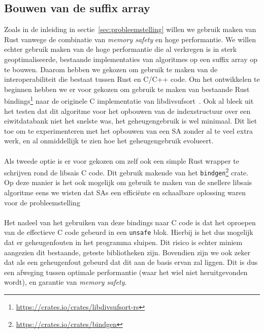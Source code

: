 \subsection{Bouwen van de suffix array}\label{subsec:bouwen-van-de-suffix-array}
Zoals in de inleiding in sectie~\ref{sec:probleemstelling} willen we gebruik maken van Rust vanwege de combinatie van \textit{memory safety} en hoge performantie.
We willen echter gebruik maken van de hoge performantie die al verkregen is in sterk geoptimaliseerde, bestaande implementaties van algoritmes op een suffix array op te bouwen.
Daarom hebben we gekozen om gebruik te maken van de interoperabiliteit die bestaat tussen Rust en C/C++ code.
Om het ontwikkelen te beginnen hebben we er voor gekozen om gebruik te maken van bestaande Rust bindings\footnote{\url{https://crates.io/crates/libdivsufsort-rs}} naar de originele C implementatie van libdivsufsort~\cite{libdivsufsort}.
Ook al bleek uit het testen dat dit algoritme voor het opbouwen van de indexstructuur over een eiwitdatabank niet het snelste was, het geheugengebruik is wel minimaal.
Dit liet toe om te experimenteren met het opbouwen van een SA zonder al te veel extra werk, en al onmiddellijk te zien hoe het geheugengebruik evolueert.
\\ \\
Als tweede optie is er voor gekozen om zelf ook een simple Rust wrapper te schrijven rond de libsais C code.
Dit gebruik makende van het \texttt{bindgen}\footnote{\url{https://crates.io/crates/bindgen}} crate.
Op deze manier is het ook mogelijk om gebruik te maken van de snellere libsais algoritme eens we wisten dat SAs een efficiënte en schaalbare oplossing waren voor de probleemstelling
\\ \\
Het nadeel van het gebruiken van deze bindings naar C code is dat het oproepen van de effectieve C code gebeurd in een \texttt{unsafe} blok.
Hierbij is het dus mogelijk dat er geheugenfouten in het programma sluipen.
Dit risico is echter miniem aangezien dit bestaande, geteste bibliotheken zijn.
Bovendien zijn we ook zeker dat als een geheugenfout gebeurd dat dit aan de basis ervan zal liggen.
Dit is dus een afweging tussen optimale performantie (waar het wiel niet heruitgevonden wordt), en garantie van \textit{memory safety}.

